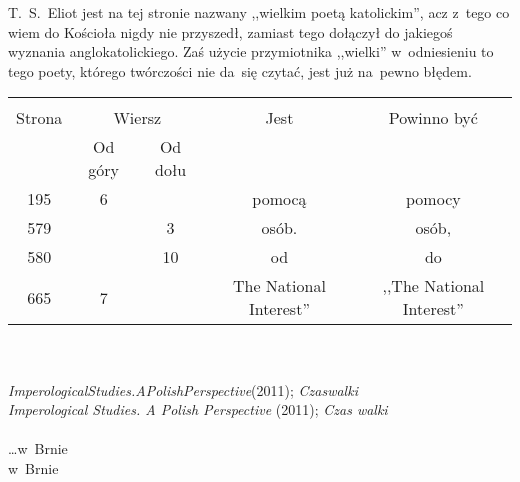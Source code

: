 \documentclass[a4paper,11pt]{article}
\begin{document}

\start {} T.~S.~Eliot jest na tej stronie nazwany ,,wielkim
poetą katolickim'', acz z~tego co wiem do Kościoła nigdy nie
przyszedł, zamiast tego dołączył do jakiegoś wyznania
anglokatolickiego. Zaś użycie przymiotnika ,,wielki'' w~odniesieniu to
tego poety, którego twórczości nie da~się czytać, jest już na~pewno
błędem.

\vspace{\spaceTwo}







\begin{center}
  \begin{tabular}{|c|c|c|c|c|}
    \hline
    & \multicolumn{2}{c|}{} & & \\
    Strona & \multicolumn{2}{c|}{Wiersz} & Jest
                              & Powinno być \\ \cline{2-3}
    & Od góry & Od dołu & & \\
    \hline
    195 &  6 & & pomocą & pomocy \\
    579 & &  3 & osób. & osób, \\
    580 & & 10 & od & do \\
    665 &  7 & & The National Interest'' & ,,The National Interest'' \\
    \hline
  \end{tabular}
\end{center}
\noi \\
 \\
\Jest \emph{ImperologicalStudies.APolishPerspective}(2011);
\emph{Czaswalki} \\
\Pow \emph{Imperological Studies. A Polish Perspective} (2011);
\emph{Czas walki} \\
 \\
\Jest \ldots w~Brnie \\
\Pow  w~Brnie \\

\vspace{\spaceTwo}
\end{document}
